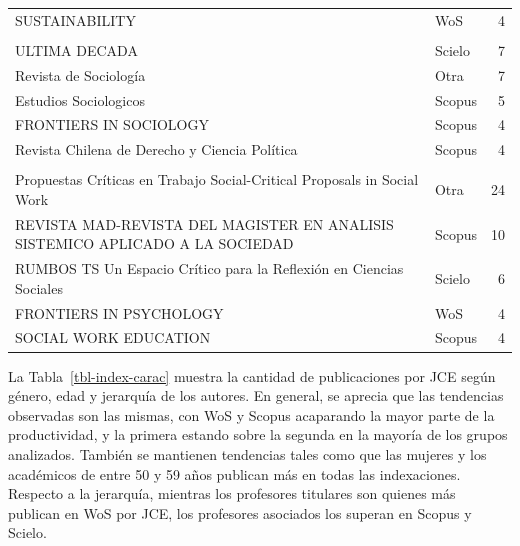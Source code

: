 \documentclass[
  a4paper,
  oneside]{scrbook}
\begin{document}
\begin{table}
{\begin{tabular}[t]{>{\raggedright\arraybackslash}p{11cm}lr}
\hspace{1em}SUSTAINABILITY & WoS & 4\\
\addlinespace[0.3em]
\multicolumn{3}{l}{\textbf{Sociología}}\\
\hspace{1em}ULTIMA DECADA & Scielo & 7\\
\hspace{1em}Revista de Sociología & Otra & 7\\
\hspace{1em}Estudios Sociologicos & Scopus & 5\\
\hspace{1em}FRONTIERS IN SOCIOLOGY & Scopus & 4\\
\hspace{1em}Revista Chilena de Derecho y Ciencia Política & Scopus & 4\\
\addlinespace[0.3em]
\multicolumn{3}{l}{\textbf{Trabajo social}}\\
\hspace{1em}Propuestas Críticas en Trabajo Social-Critical Proposals in Social Work & Otra & 24\\
\hspace{1em}REVISTA MAD-REVISTA DEL MAGISTER EN ANALISIS SISTEMICO APLICADO A LA SOCIEDAD & Scopus & 10\\
\hspace{1em}RUMBOS TS Un Espacio Crítico para la Reflexión en Ciencias Sociales & Scielo & 6\\
\hspace{1em}FRONTIERS IN PSYCHOLOGY & WoS & 4\\
\hspace{1em}SOCIAL WORK EDUCATION & Scopus & 4\\
\bottomrule
\end{tabular}

}

\end{table}%

La Tabla~\ref{tbl-index-carac} muestra la cantidad de publicaciones por
JCE según género, edad y jerarquía de los autores. En general, se
aprecia que las tendencias observadas son las mismas, con WoS y Scopus
acaparando la mayor parte de la productividad, y la primera estando
sobre la segunda en la mayoría de los grupos analizados. También se
mantienen tendencias tales como que las mujeres y los académicos de
entre 50 y 59 años publican más en todas las indexaciones. Respecto a la
jerarquía, mientras los profesores titulares son quienes más publican en
WoS por JCE, los profesores asociados los superan en Scopus y Scielo.
\end{document}
